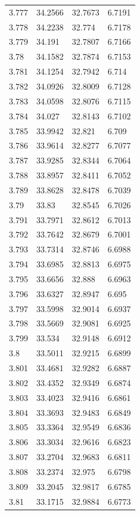 \begin{tabular}{llll}
3.777 & 34.2566 & 32.7673 & 6.7191 \\
3.778 & 34.2238 & 32.774 & 6.7178 \\
3.779 & 34.191 & 32.7807 & 6.7166 \\
3.78 & 34.1582 & 32.7874 & 6.7153 \\
3.781 & 34.1254 & 32.7942 & 6.714 \\
3.782 & 34.0926 & 32.8009 & 6.7128 \\
3.783 & 34.0598 & 32.8076 & 6.7115 \\
3.784 & 34.027 & 32.8143 & 6.7102 \\
3.785 & 33.9942 & 32.821 & 6.709 \\
3.786 & 33.9614 & 32.8277 & 6.7077 \\
3.787 & 33.9285 & 32.8344 & 6.7064 \\
3.788 & 33.8957 & 32.8411 & 6.7052 \\
3.789 & 33.8628 & 32.8478 & 6.7039 \\
3.79 & 33.83 & 32.8545 & 6.7026 \\
3.791 & 33.7971 & 32.8612 & 6.7013 \\
3.792 & 33.7642 & 32.8679 & 6.7001 \\
3.793 & 33.7314 & 32.8746 & 6.6988 \\
3.794 & 33.6985 & 32.8813 & 6.6975 \\
3.795 & 33.6656 & 32.888 & 6.6963 \\
3.796 & 33.6327 & 32.8947 & 6.695 \\
3.797 & 33.5998 & 32.9014 & 6.6937 \\
3.798 & 33.5669 & 32.9081 & 6.6925 \\
3.799 & 33.534 & 32.9148 & 6.6912 \\
3.8 & 33.5011 & 32.9215 & 6.6899 \\
3.801 & 33.4681 & 32.9282 & 6.6887 \\
3.802 & 33.4352 & 32.9349 & 6.6874 \\
3.803 & 33.4023 & 32.9416 & 6.6861 \\
3.804 & 33.3693 & 32.9483 & 6.6849 \\
3.805 & 33.3364 & 32.9549 & 6.6836 \\
3.806 & 33.3034 & 32.9616 & 6.6823 \\
3.807 & 33.2704 & 32.9683 & 6.6811 \\
3.808 & 33.2374 & 32.975 & 6.6798 \\
3.809 & 33.2045 & 32.9817 & 6.6785 \\
3.81 & 33.1715 & 32.9884 & 6.6773 \\

\end{tabular}
